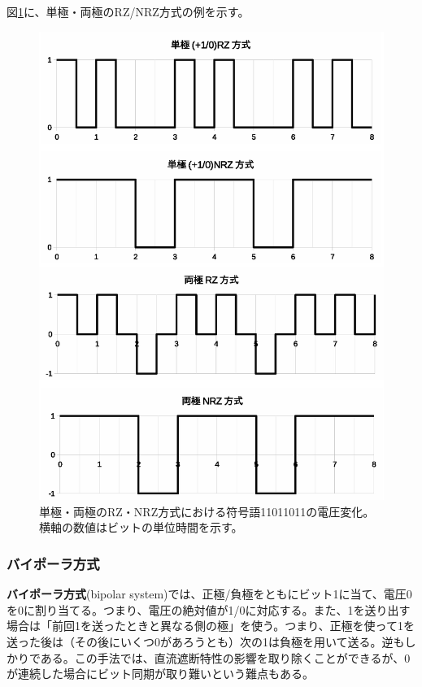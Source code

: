 図\ref{fig5_1}に、単極・両極のRZ/NRZ方式の例を示す。
\begin{figure}[htbp]
\centering
\includegraphics[width=0.8\linewidth,keepaspectratio]{fig/fig5_1.eps}
\caption{単極・両極のRZ・NRZ方式における符号語11011011の電圧変化。横軸の数値はビットの単位時間を示す。}
\label{fig5_1}
\end{figure}

\subsubsection{バイポーラ方式}  
\textbf{バイポーラ方式}(bipolar system)では、正極/負極をともにビット1に当て、電圧0を0に割り当てる。つまり、電圧の絶対値が1/0に対応する。また、1を送り出す場合は「前回1を送ったときと異なる側の極」を使う。つまり、正極を使って1を送った後は（その後にいくつ0があろうとも）次の1は負極を用いて送る。逆もしかりである。この手法では、直流遮断特性の影響を取り除くことができるが、0が連続した場合にビット同期が取り難いという難点もある。

